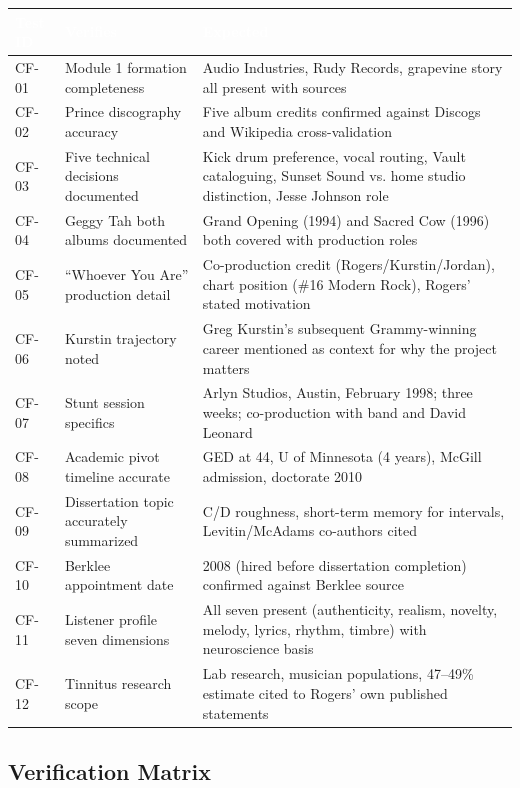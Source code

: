 \documentclass[11pt,letterpaper]{article}
\newcommand{\tableheader}[1]{\textbf{\sffamily\textcolor{white}{#1}}}
\begin{document}
\begin{center}
\begin{tabularx}{\textwidth}{C{1.5cm}L{4.5cm}X}
\toprule
{}
\tableheader{Test ID} & \tableheader{Verifies} & \tableheader{Expected} \\
\midrule
CF-01 & Module 1 formation completeness & Audio Industries, Rudy Records, grapevine story all present with sources \\
CF-02 & Prince discography accuracy & Five album credits confirmed against Discogs and Wikipedia cross-validation \\
CF-03 & Five technical decisions documented & Kick drum preference, vocal routing, Vault cataloguing, Sunset Sound vs. home studio distinction, Jesse Johnson role \\
CF-04 & Geggy Tah both albums documented & Grand Opening (1994) and Sacred Cow (1996) both covered with production roles \\
CF-05 & ``Whoever You Are'' production detail & Co-production credit (Rogers/Kurstin/Jordan), chart position (\#16 Modern Rock), Rogers' stated motivation \\
CF-06 & Kurstin trajectory noted & Greg Kurstin's subsequent Grammy-winning career mentioned as context for why the project matters \\
CF-07 & Stunt session specifics & Arlyn Studios, Austin, February 1998; three weeks; co-production with band and David Leonard \\
CF-08 & Academic pivot timeline accurate & GED at 44, U of Minnesota (4 years), McGill admission, doctorate 2010 \\
CF-09 & Dissertation topic accurately summarized & C/D roughness, short-term memory for intervals, Levitin/McAdams co-authors cited \\
CF-10 & Berklee appointment date & 2008 (hired before dissertation completion) confirmed against Berklee source \\
CF-11 & Listener profile seven dimensions & All seven present (authenticity, realism, novelty, melody, lyrics, rhythm, timbre) with neuroscience basis \\
CF-12 & Tinnitus research scope & Lab research, musician populations, 47--49\% estimate cited to Rogers' own published statements \\
\bottomrule
\end{tabularx}
\end{center}

\subsection{Verification Matrix}
\end{document}
